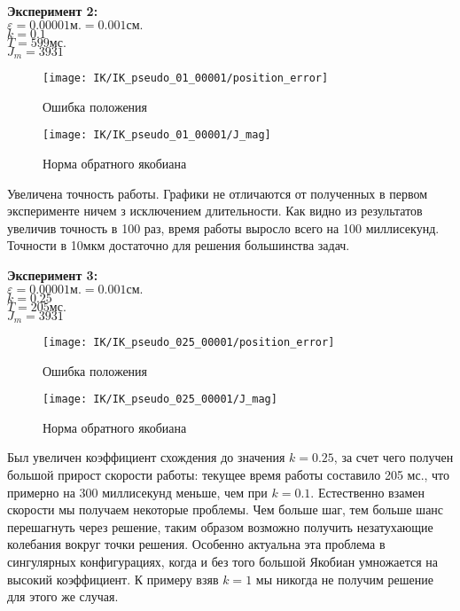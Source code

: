 	 	\clearpage
		\textbf{Эксперимент 2:}\\
		$\varepsilon = 0.00001\text{м.} = 0.001\text{см.}$\\
		$k = 0.1$\\
		$T = 599 \text{мс.}$\\
		$J_{m} = 3931$
		
		\begin{figure}[h!]
			\centering
			\texttt{[image: IK/IK\_pseudo\_01\_00001/position\_error]}
			\caption{Ошибка положения}
			\label{fig:4_4_3}
		\end{figure}
		\begin{figure}[h!]
			\centering
			\texttt{[image: IK/IK\_pseudo\_01\_00001/J\_mag]}
			\caption{Норма обратного якобиана}
			\label{fig:4_4_4}
		\end{figure}
		Увеличена точность работы. Графики не отличаются от полученных в первом эксперименте ничем з исключением длительности. Как видно из результатов увеличив точность в 100 раз, время работы выросло всего на 100 миллисекунд. Точности в 10мкм достаточно для решения большинства задач.
		
		\clearpage
		\textbf{Эксперимент 3:}\\
		$\varepsilon = 0.00001\text{м.} = 0.001\text{см.}$\\
		$k = 0.25$\\
		$T = 205 \text{мс.}$\\
		$J_{m} = 3931$
		
		\begin{figure}[h!]
			\centering
			\texttt{[image: IK/IK\_pseudo\_025\_00001/position\_error]}
			\caption{Ошибка положения}
			\label{fig:4_4_5}
		\end{figure}
		\begin{figure}[h!]
			\centering
			\texttt{[image: IK/IK\_pseudo\_025\_00001/J\_mag]}
			\caption{Норма обратного якобиана}
			\label{fig:4_4_6}
		\end{figure}
		Был увеличен коэффициент схождения до значения $k=0.25$, за счет чего получен большой прирост скорости работы: текущее время работы составило 205 мс., что примерно на 300 миллисекунд меньше, чем при $k=0.1$. Естественно взамен скорости мы получаем некоторые проблемы. Чем больше шаг, тем больше шанс перешагнуть через решение, таким образом возможно получить незатухающие колебания вокруг точки решения. Особенно актуальна эта проблема в сингулярных конфигурациях, когда и без того большой Якобиан умножается на высокий коэффициент. К примеру взяв $k=1$ мы никогда не получим решение для этого же случая.
		
